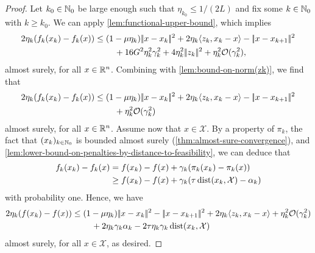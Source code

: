 \begin{proof}
    Let $k_0\in\mathbb{N}_0$ be large enough such that $\eta_{k_0} \leq 1/(2L)$ and fix
    some $k\in\mathbb{N}_0$ with $k \geq k_0$.
    We can apply \cref{lem:functional-upper-bound}, which implies
    \begin{align*}
        2\eta_k(f_k(x_k) - f_k(x))
        &\leq ( 1 - \mu\eta_k ) |\!|x - x_k|\!|^2 + 2\eta_k\langle z_k, x_k - x \rangle 
            - |\!|x - x_{k+1}|\!|^2 \\
        &\phantom{===} + 16 G^2\eta_k^2\gamma_k^2
            + 4\eta_k^2|\!|z_k|\!|^2
            + \eta_k^2 \mathcal{O}(\gamma_k^2),
    \end{align*}
    almost surely, for all $x\in\mathbb{R}^n$.
    Combining with \cref{lem:bound-on-norm(zk)},
    we find that
    \begin{align*}
        2\eta_k(f_k(x_k) - f_k(x))
        &\leq (1 - \mu\eta_k)|\!|x - x_k|\!|^2 + 2\eta_k\langle z_k, x_k - x \rangle 
            - |\!|x - x_{k+1}|\!|^2 \notag \\
        &\phantom{===} + \eta_k^2\mathcal{O}(\gamma_k^2)
    \end{align*}
    almost surely, for all $x\in\mathbb{R}^n$.
        Assume now that $x\in\mathcal{X}$. By a property of $\pi_k$, the fact that
    $(x_k)_{k\in\mathbb{N}_0}$ is bounded almost surely (\cref{thm:almost-sure-convergence}), and \cref{lem:lower-bound-on-penalties-by-distance-to-feasibility},
    we can deduce that
    \begin{align*}
        f_k(x_{k}) - f_k(x)
        &= f(x_k) - f(x) + \gamma_k (\pi_k(x_k) - \pi_k(x)) \\
        &\geq f(x_k) - f(x) + \gamma_k (\tau\operatorname{dist}(x_k,\mathcal{X}) - \alpha_k)
    \end{align*}
    with probability one. Hence, we have
    \begin{align*}
        2\eta_k (f(x_{k}) - f(x))
        &\leq
        (1-\mu\eta_k)|\!|x - x_k|\!|^2 - |\!|x - x_{k+1}|\!|^2 + 2\eta_k\langle z_k, x_k - x \rangle
            + \eta_k^2 \mathcal{O}(\gamma_k^2) \notag \\
            &\phantom{===} + 2\eta_k\gamma_k\alpha_k - 2\tau \eta_k \gamma_k \operatorname{dist}(x_k, \mathcal{X})
    \end{align*}
    almost surely, for all $x\in\mathcal{X}$, as desired.
\end{proof}

